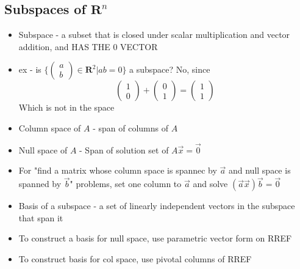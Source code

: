 \documentclass{article}
\begin{document}
\subsection{Subspaces of \(\textbf{R}^n\)}
\begin{itemize}
    \item Subspace - a subset that is closed under scalar multiplication and vector addition, and HAS THE 0 VECTOR 
    \item ex - is \(\{\begin{pmatrix} a\\b \end{pmatrix}\in \textbf{R}^2 | ab=0\}\) a subspace? No, since \[\begin{pmatrix} 1\\0 \end{pmatrix}+\begin{pmatrix} 0\\1 \end{pmatrix} = \begin{pmatrix} 1\\1 \end{pmatrix}\] Which is not in the space 
    \item Column space of \(A\) - span of columns of \(A\)
    \item Null space of \(A\) - Span of solution set of \(A\vec{x}=\vec{0}\)
    \item For "find a matrix whose column space is spannec by \(\vec{a}\) and null space is spanned by \(\vec{b}\)" problems, set one column to \(\vec{a}\) and solve \((\vec{a} \vec{x})\vec{b}=\vec{0}\)
    \item Basis of a subspace - a set of linearly independent vectors in the subspace that span it
    \item To construct a basis for null space, use parametric vector form on RREF 
    \item To construct basis for col space, use pivotal columns of RREF
\end{itemize}
\end{document}
